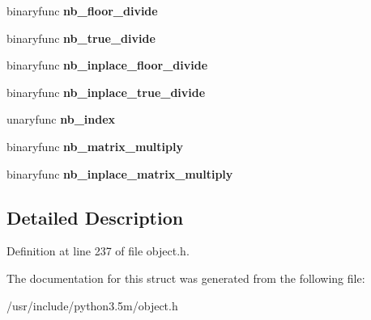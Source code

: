 \begin{DoxyCompactItemize}
\item 
binaryfunc {\bfseries nb\+\_\+floor\+\_\+divide}\hypertarget{structPyNumberMethods_a05f22c9ef56fb0c264dd1987975f6c0c}{}\label{structPyNumberMethods_a05f22c9ef56fb0c264dd1987975f6c0c}

\item 
binaryfunc {\bfseries nb\+\_\+true\+\_\+divide}\hypertarget{structPyNumberMethods_a7de1a2730c487e2dcce5babec5b24bed}{}\label{structPyNumberMethods_a7de1a2730c487e2dcce5babec5b24bed}

\item 
binaryfunc {\bfseries nb\+\_\+inplace\+\_\+floor\+\_\+divide}\hypertarget{structPyNumberMethods_af12f77b35585ee95c1721216a3542d13}{}\label{structPyNumberMethods_af12f77b35585ee95c1721216a3542d13}

\item 
binaryfunc {\bfseries nb\+\_\+inplace\+\_\+true\+\_\+divide}\hypertarget{structPyNumberMethods_a97f52131b7b10b1f37f7cbe1fe9835a3}{}\label{structPyNumberMethods_a97f52131b7b10b1f37f7cbe1fe9835a3}

\item 
unaryfunc {\bfseries nb\+\_\+index}\hypertarget{structPyNumberMethods_ade4ff47ded0d8b356dfbca189fc35bc6}{}\label{structPyNumberMethods_ade4ff47ded0d8b356dfbca189fc35bc6}

\item 
binaryfunc {\bfseries nb\+\_\+matrix\+\_\+multiply}\hypertarget{structPyNumberMethods_aa55b9351d0046399002d74dc593f580c}{}\label{structPyNumberMethods_aa55b9351d0046399002d74dc593f580c}

\item 
binaryfunc {\bfseries nb\+\_\+inplace\+\_\+matrix\+\_\+multiply}\hypertarget{structPyNumberMethods_a412af2eae5b355af32641e75ae611e3d}{}\label{structPyNumberMethods_a412af2eae5b355af32641e75ae611e3d}

\end{DoxyCompactItemize}


\subsection{Detailed Description}


Definition at line 237 of file object.\+h.



The documentation for this struct was generated from the following file\+:\begin{DoxyCompactItemize}
\item 
/usr/include/python3.\+5m/object.\+h\end{DoxyCompactItemize}
